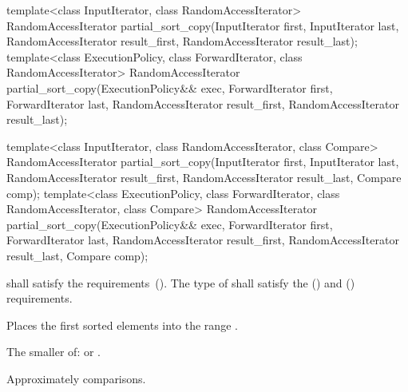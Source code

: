 %
\begin{itemdecl}
template<class InputIterator, class RandomAccessIterator>
  RandomAccessIterator
    partial_sort_copy(InputIterator first, InputIterator last,
                      RandomAccessIterator result_first,
                      RandomAccessIterator result_last);
template<class ExecutionPolicy, class ForwardIterator, class RandomAccessIterator>
  RandomAccessIterator
    partial_sort_copy(ExecutionPolicy&& exec,
                      ForwardIterator first, ForwardIterator last,
                      RandomAccessIterator result_first,
                      RandomAccessIterator result_last);

template<class InputIterator, class RandomAccessIterator,
         class Compare>
  RandomAccessIterator
    partial_sort_copy(InputIterator first, InputIterator last,
                      RandomAccessIterator result_first,
                      RandomAccessIterator result_last,
                      Compare comp);
template<class ExecutionPolicy, class ForwardIterator, class RandomAccessIterator,
         class Compare>
  RandomAccessIterator
    partial_sort_copy(ExecutionPolicy&& exec,
                      ForwardIterator first, ForwardIterator last,
                      RandomAccessIterator result_first,
                      RandomAccessIterator result_last,
                      Compare comp);
\end{itemdecl}

\begin{itemdescr}
\pnum
\requires
{} shall satisfy the
 requirements~(). The type
of  shall satisfy the
 () and
 () requirements.

\pnum
\effects
Places the first
sorted elements into the range
.

\pnum
\returns
The smaller of:
 or
.

\pnum
\complexity
Approximately
comparisons.
\end{itemdescr}

